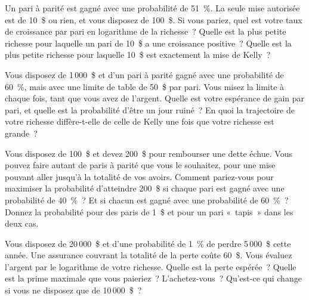 \begin{question}\label{iq:iv2:betting-and-kelly:17}
Un pari à parité est gagné avec une probabilité de 51~\%. La seule mise autorisée est de 10~\$ ou rien, et vous disposez de 100~\$. Si vous pariez, quel est votre taux de croissance par pari en logarithme de la richesse~? Quelle est la plus petite richesse pour laquelle un pari de 10~\$ a une croissance positive~? Quelle est la plus petite richesse pour laquelle 10~\$ est exactement la mise de Kelly~?
\end{question}

\begin{question}\label{iq:iv2:betting-and-kelly:18}
Vous disposez de 1\,000~\$ et d'un pari à parité gagné avec une probabilité de 60~\%, mais avec une limite de table de 50~\$ par pari. Vous misez la limite à chaque fois, tant que vous avez de l'argent. Quelle est votre espérance de gain par pari, et quelle est la probabilité d'être un jour ruiné~? En quoi la trajectoire de votre richesse diffère-t-elle de celle de Kelly une fois que votre richesse est grande~?
\end{question}

\begin{question}\label{iq:iv2:betting-and-kelly:19}
Vous disposez de 100~\$ et devez 200~\$ pour rembourser une dette échue. Vous pouvez faire autant de paris à parité que vous le souhaitez, pour une mise pouvant aller jusqu'à la totalité de vos avoirs. Comment pariez-vous pour maximiser la probabilité d'atteindre 200~\$ si chaque pari est gagné avec une probabilité de 40~\%~? Et si chacun est gagné avec une probabilité de 60~\%~? Donnez la probabilité pour des paris de 1~\$ et pour un pari «~tapis~» dans les deux cas.
\end{question}

\begin{question}\label{iq:iv2:betting-and-kelly:20}
Vous disposez de 20\,000~\$ et d'une probabilité de 1~\% de perdre 5\,000~\$ cette année. Une assurance couvrant la totalité de la perte coûte 60~\$. Vous évaluez l'argent par le logarithme de votre richesse. Quelle est la perte espérée~? Quelle est la prime maximale que vous paieriez~? L'achetez-vous~? Qu'est-ce qui change si vous ne disposez que de 10\,000~\$~?
\end{question}

